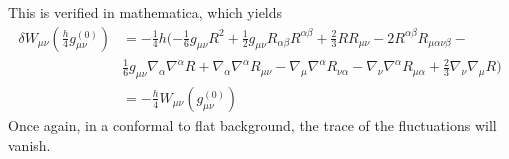 \documentclass[10pt,letterpaper]{article}
\begin{document}
\ee
This is verified in mathematica, which yields
\begin{align}
	\delta W_{\mu\nu}(\tfrac{h}{4}g^{(0)}_{\mu\nu}) &= - \tfrac{1}{4} h (- \tfrac{1}{6} g_{\mu \nu} R^2 + \tfrac{1}{2} g_{\mu \nu} R_{\alpha \beta} R^{\alpha \beta} + \tfrac{2}{3} R R_{\mu \nu} - 2 R^{\alpha \beta} R_{\mu \alpha \nu \beta} -  \\
	&\tfrac{1}{6} g_{\mu \nu} \nabla_{\alpha}\nabla^{\alpha}R + \nabla_{\alpha}\nabla^{\alpha}R_{\mu \nu} -  \nabla_{\mu}\nabla^{\alpha}R_{\nu \alpha} -  \nabla_{\nu}\nabla^{\alpha}R_{\mu \alpha} + \tfrac{2}{3} \nabla_{\nu}\nabla_{\mu}R)\\
	&= -\tfrac{h}{4}W_{\mu\nu}(g^{(0)}_{\mu\nu})
\end{align}
Once again, in a conformal to flat background, the trace of the fluctuations will vanish. 
\\ \\
\end{document}
